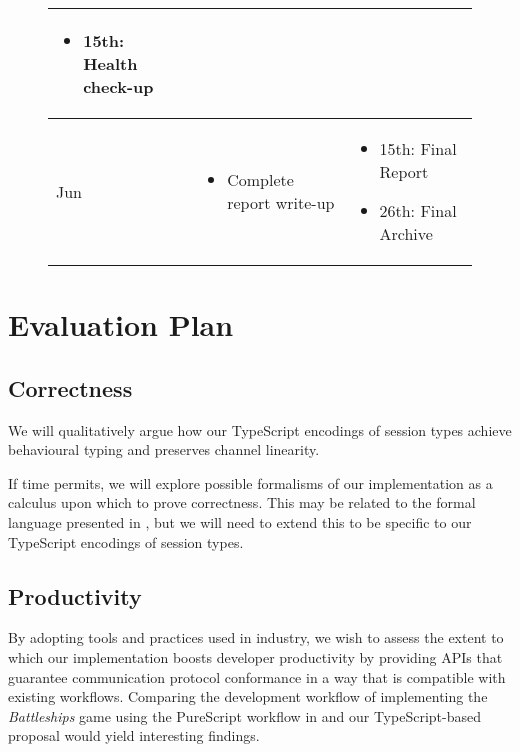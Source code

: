 \documentclass[12pt,twoside]{report}
\begin{document}
\begin{figure}
\begin{tabular}{l|p{}|p{}}
\begin{itemize}
\item 15th: Health check-up
\end{itemize}\\
\hline
Jun & \begin{itemize}
\item Complete report write-up
\end{itemize} & \begin{itemize}
\item 15th: Final Report
\item 26th: Final Archive
\end{itemize}
\end{tabular}
\label{table:timetable}
\end{figure}


\chapter{Evaluation Plan}

\section{Correctness}
We will qualitatively argue how our TypeScript encodings of session types achieve behavioural typing and preserves channel linearity.

If time permits, we will explore possible formalisms of our implementation as a calculus upon which to prove correctness. This may be related to the formal language presented in \cite{UnderstandingTypeScript}, but we will need to extend this to be specific to our TypeScript encodings of session types.

\section{Productivity} 
By adopting tools and practices used in industry, we wish to assess the extent to which our implementation boosts developer productivity by providing APIs that guarantee communication protocol conformance in a way that is compatible with existing workflows. Comparing the development workflow of implementing the \textit{Battleships} game using the PureScript workflow in \cite{PureScript2019} and our TypeScript-based proposal would yield interesting findings.
\end{document}
